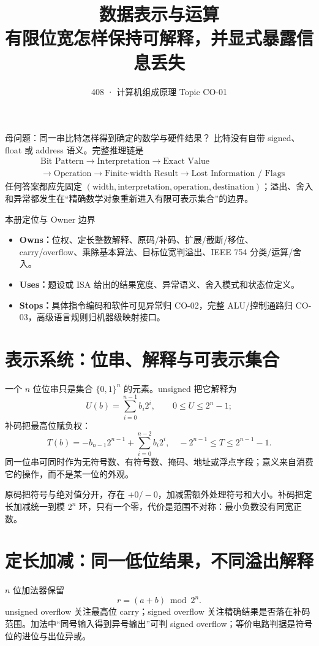 \documentclass[UTF8,fontset=fandol,11pt,a4paper]{ctexart}
\title{\vspace{-1.1cm}\textbf{数据表示与运算}\\[0.4em]\large 有限位宽怎样保持可解释，并显式暴露信息丢失}
\author{408 · 计算机组成原理 Topic CO-01}
\date{}
\newcommand{\kw}[1]{\textbf{\color{deep}#1}}
\begin{document}
\maketitle

\begin{corebox}{母问题：同一串比特怎样得到确定的数学与硬件结果？}
比特没有自带 signed、float 或 address 语义。完整推理链是
\[
\begin{aligned}
&\text{Bit Pattern}\to\text{Interpretation}\to\text{Exact Value}\\
&\to\text{Operation}\to\text{Finite-width Result}\to\text{Lost Information / Flags}
\end{aligned}
\]
任何答案都应先固定 $(\text{width},\text{interpretation},\text{operation},\text{destination})$；溢出、舍入和异常都发生在“精确数学对象重新进入有限可表示集合”的边界。
\end{corebox}

\begin{methodbox}{本册定位与 Owner 边界}
\begin{itemize}
\item \kw{Owns：}位权、定长整数解释、原码/补码、扩展/截断/移位、carry/overflow、乘除基本算法、目标位宽判溢出、IEEE 754 分类/运算/舍入。
\item \kw{Uses：}题设或 ISA 给出的结果宽度、异常语义、舍入模式和状态位定义。
\item \kw{Stops：}具体指令编码和软件可见异常归 CO-02，完整 ALU/控制通路归 CO-03，高级语言规则归机器级映射接口。
\end{itemize}
\end{methodbox}

\tableofcontents
\newpage

\section{表示系统：位串、解释与可表示集合}
一个 $n$ 位位串只是集合 $\{0,1\}^n$ 的元素。unsigned 把它解释为
\[
U(b)=\sum_{i=0}^{n-1}b_i2^i,\qquad 0\le U\le 2^n-1;
\]
补码把最高位赋负权：
\[
T(b)=-b_{n-1}2^{n-1}+\sum_{i=0}^{n-2}b_i2^i,
\quad -2^{n-1}\le T\le2^{n-1}-1.
\]
同一位串可同时作为无符号数、有符号数、掩码、地址或浮点字段；意义来自消费它的操作，而不是某一位的外观。

原码把符号与绝对值分开，存在 $+0/-0$，加减需额外处理符号和大小。补码把定长加减统一到模 $2^n$ 环，只有一个零，代价是范围不对称：最小负数没有同宽正数。

\section{定长加减：同一低位结果，不同溢出解释}
$n$ 位加法器保留
\[
r=(a+b)\bmod 2^n.
\]
unsigned overflow 关注最高位 carry；signed overflow 关注精确结果是否落在补码范围。加法中“同号输入得到异号输出”可判 signed overflow；等价电路判据是符号位的进位与出位异或。
\end{document}
